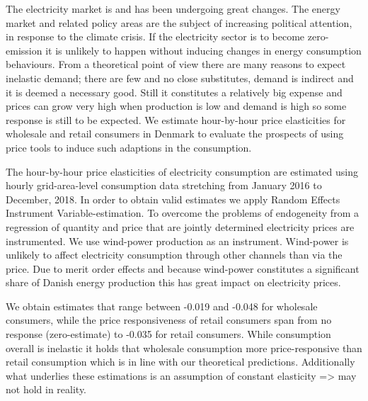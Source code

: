 \label{sec:conclusion}
\begin{comment}
1. Introduktion -> hvorfor spændende; ændret marked 
(2. Tidligere studier -> kobles i stedet for unde resultater) 
3. Teori -> Udbud og efterspørgselskarakteristika 
4. Data ? 
5. Estimation
6. Resultater og diskussion: Måske i kombination med andre initiativer, højere grad af eksponering til de faktiske priser, men stadig meget, der kan undersøges endnu 
\end{comment}
The electricity market is and has been undergoing great changes. The energy market and related policy areas are the subject of increasing political attention, in response to the climate crisis. If the electricity sector is to become zero-emission it is unlikely to happen without inducing changes in energy consumption behaviours. From a theoretical point of view there are many reasons to expect inelastic demand; there are few and no close substitutes, demand is indirect and it is deemed a necessary good. Still it constitutes a relatively big expense and prices can grow very high when production is low and demand is high so some response is still to be expected. We estimate hour-by-hour price elasticities for wholesale and retail consumers in Denmark to evaluate the prospects of using price tools to induce such adaptions in the consumption. \bigskip

The hour-by-hour price elasticities of electricity consumption are estimated using hourly grid-area-level consumption data stretching from January 2016 to December, 2018. In order to obtain valid estimates we apply Random Effects Instrument Variable-estimation. To overcome the problems of endogeneity from a regression of quantity and price that are jointly determined electricity prices are instrumented. We use wind-power production as an instrument. Wind-power is unlikely to affect electricity consumption through other channels than via the price. Due to merit order effects and because wind-power constitutes a significant share of Danish energy production this has great impact on electricity prices.\bigskip 

We obtain estimates that range between -0.019 and -0.048 for wholesale consumers, while the price responsiveness of retail consumers span from no response (zero-estimate) to -0.035 for retail consumers.  While consumption overall is inelastic it holds that wholesale consumption more price-responsive than retail consumption which is in line with our theoretical predictions. Additionally what underlies these estimations is an assumption of constant elasticity => may not hold in reality. 

